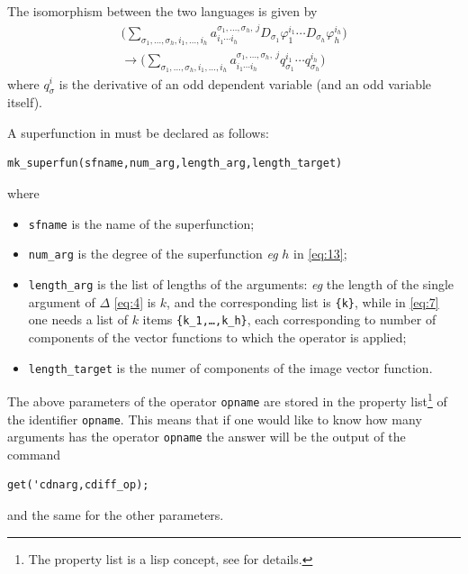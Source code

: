The isomorphism between the two languages is given by
\begin{equation}
  \label{eq:13}
  \begin{split}
  \Big(\sum_{\sigma_1,\ldots,\sigma_h, i_1,\ldots,
    i_h}a^{\sigma_1,\ldots,\sigma_h,\ j}_{i_1\cdots i_h} D_{\sigma_1}
  \varphi_1^{i_1}\cdots D_{\sigma_h}\varphi_h^{i_h}\Big) \\
  \longrightarrow
    \Big(\sum_{\sigma_1,\ldots,\sigma_h, i_1,\ldots,
      i_h}a^{\sigma_1,\ldots,\sigma_h,\ j}_{i_1\cdots i_h}
        q^{i_1}_{\sigma_1} \cdots q^{i_h}_{\sigma_h}\Big)
      \end{split}
    \end{equation}
where $q^i_\sigma$ is the derivative of an odd dependent variable (and an odd
variable itself).

A superfunction in \cde must be declared as follows:
\hypertarget{operator:MK_SUPERFUN}{}
\begin{verbatim}
mk_superfun(sfname,num_arg,length_arg,length_target)
\end{verbatim}
where
\begin{itemize}
\item \texttt{sfname} is the name of the superfunction;
\item \texttt{num\_arg} is the degree of the superfunction \emph{eg} $h$ in
  \eqref{eq:13};
\item \texttt{length\_arg} is the list of lengths of the arguments: \emph{eg}
  the length of the single argument of $\Delta$ \eqref{eq:4} is $k$, and the
  corresponding list is \texttt{\{k\}}, while in \eqref{eq:7} one needs a list
  of $k$ items \texttt{\{k\_1,\dots,k\_h\}}, each corresponding to number of
  components of the vector functions to which the operator is applied;
\item \texttt{length\_target} is the numer of components of the image vector
  function.
\end{itemize}
The above parameters of the operator \texttt{opname} are stored in the property
list\footnote{The property list is a lisp concept, see \cite{NormanVitolo:InsideReduce} for
  details.} of the identifier \texttt{opname}. This means that if one would
like to know how many arguments has the operator \texttt{opname} the answer
will be the output of the command
\begin{verbatim}
get('cdnarg,cdiff_op);
\end{verbatim}
and the same for the other parameters.

